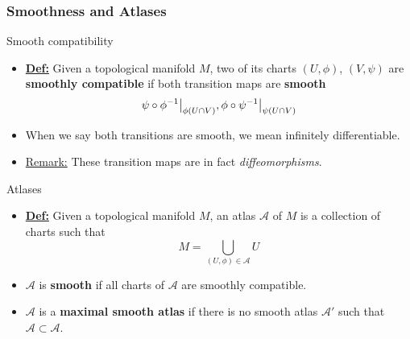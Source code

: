 \documentclass{article}
\newcommand{\restr}[2]{{%
  \left.\kern-\nulldelimiterspace %
  #1 %
  \vphantom{\big|} %
  \right|_{#2} %
  }}
\begin{document}
\vskip 1cm
\subsubsection{Smoothness and Atlases}

\vskip 1cm
\begin{mathdefinitionbox}{Smooth compatibility}
  \begin{itemize}
    \item   \underline{\textbf{Def:}} Given a topological manifold $M$, two of its charts $(U, \phi)$, $(V, \psi)$ are \textbf{smoothly compatible} if both transition maps are \textbf{smooth}
    \[ \restr{\psi \circ \phi^{-1}}{\phi(U \cap V)}, \restr{\phi \circ \psi^{-1}}{\psi(U \cap V)} \]
    
    \item When we say both transitions are smooth, we mean infinitely differentiable.
    \item \underline{Remark:} These transition maps are in fact \emph{diffeomorphisms}.
  \end{itemize}
\end{mathdefinitionbox}

\vskip 1cm
\begin{mathdefinitionbox}{Atlases}
  \begin{itemize}
    \item \underline{\textbf{Def:}} Given a topological manifold $M$, an atlas $\mathcal{A}$ of $M$ is a collection of charts such that 
    \[ M = \bigcup_{(U, \phi) \in \mathcal{A}} U \]

    \item $\mathcal A$ is \textbf{smooth} if all charts of $\mathcal A$ are smoothly compatible.
    
    \item $\mathcal{A}$ is a \textbf{maximal smooth atlas} if there is no smooth atlas $\mathcal{A}'$ such that $\mathcal{A} \subset \mathcal{A}$. 
  \end{itemize}
\end{mathdefinitionbox}
\end{document}
